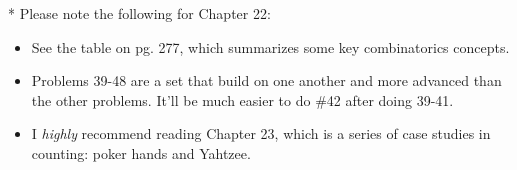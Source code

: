 \documentclass[12pt]{article}
\begin{document}
\begin{center}
\begin{tabular}{|c|c||c|}
%

\hline

\end{tabular}
\end{center}




* Please note the following for Chapter 22:
\begin{itemize}
\item See the table on pg. 277, which summarizes some key combinatorics concepts.
\item Problems 39-48 are a set that build on one another and more advanced than the other problems.  It'll be much easier to do \#42 after doing 39-41.
\item I \emph{highly} recommend reading Chapter 23, which is a series of case studies in counting: poker hands and Yahtzee. 
\end{itemize}
\end{document}
